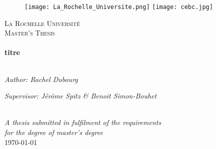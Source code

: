 \begin{titlepage}

\begin{figure}[ht]
			\texttt{[image: La\_Rochelle\_Universite.png]}
			\label{logoLR}
	   \endminipage
			\texttt{[image: cebc.jpg]}
			\label{logocebc}
		\endminipage
	\end{figure}


\begin{center}

\textsc{\LARGE La Rochelle Université}\\[1.5cm] %
\textsc{\Large Master's Thesis}\\[0.5cm] %

\HRule \\[0.4cm] %
{\huge \bfseries titre}\\[0.4cm] %
\HRule \\[1.5cm] %

\begin{minipage}{0.4\textwidth}
\begin{flushleft} \large
\emph{Author: Rachel Dubourg}\\
\end{flushleft}
\end{minipage}
\begin{minipage}{0.4\textwidth}
\begin{flushright} \large
\emph{Supervisor: Jérôme Spitz \& Benoit Simon-Bouhet} \\
\end{flushright}
\end{minipage}\\[3cm]

\large \textit{A thesis submitted in fulfilment of the requirements\\ for the degree of master's degree}\\[0.3cm] %

{\large \today}\\[4cm]



\end{center}
\end{titlepage}
